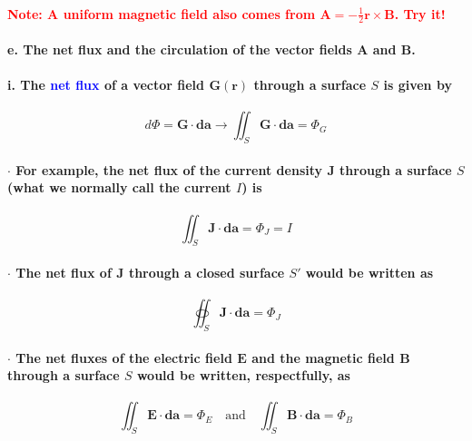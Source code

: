 \documentclass{article}
\begin{document}
\paragraph{\indent \textcolor{red}{Note: A uniform magnetic field also comes from $\boldsymbol{A}=-\frac{1}{2}\boldsymbol{r}\times\boldsymbol{B}$. Try it!}}
\paragraph{\indent e. The net flux and the circulation of the vector fields $\boldsymbol{A}$ and $\boldsymbol{B}$.}
\paragraph{\indent \indent i. The \textcolor{blue}{net flux} of a vector field $\boldsymbol{G}(\boldsymbol{r})$ through a surface $S$ is given by}
\begin{equation*}
    d\Phi=\boldsymbol{G}\cdot\boldsymbol{da}\longrightarrow\iint_S\boldsymbol{G}\cdot\boldsymbol{da}=\Phi_G
\end{equation*}
\paragraph{\indent $\cdot$ For example, the net flux of the current density $\boldsymbol{J}$ through a surface $S$ (what we normally call the current $I$) is}
\begin{equation*}
    \iint_S\boldsymbol{J}\cdot\boldsymbol{da}=\Phi_J=I
\end{equation*}
\paragraph{\indent $\cdot$ The net flux of $\boldsymbol{J}$ through a closed surface $S'$ would be written as}
\begin{equation*}
    \oiint_S\boldsymbol{J}\cdot\boldsymbol{da}=\Phi_J
\end{equation*}
\paragraph{\indent $\cdot$ The net fluxes of the electric field $\boldsymbol{E}$ and the magnetic field $\boldsymbol{B}$ through a surface $S$ would be written, respectfully, as}
\begin{equation*}
    \iint_S\boldsymbol{E}\cdot\boldsymbol{da}=\Phi_E\quad\text{and}\quad \iint_S\boldsymbol{B}\cdot\boldsymbol{da}=\Phi_B
\end{equation*}
\end{document}
